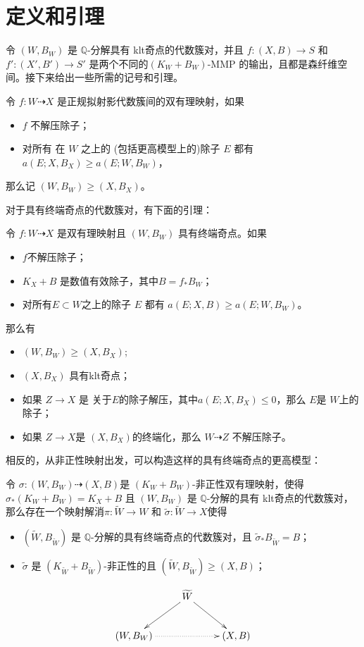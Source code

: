 \section{定义和引理}
令 $(W, B_W)$ 是 $\mathbb{Q}$-分解具有 klt奇点的代数簇对，并且 $f:(X, B)\to S$ 和 $f':(X', B')\to S'$ 是两个不同的$(K_{W}+B_{W})$-MMP 的输出，且都是森纤维空间。接下来给出一些所需的记号和引理。 
\begin{definition}
  令 $f: W\dashrightarrow X$ 是正规拟射影代数簇间的双有理映射，如果
  \begin{itemize}
    \item $f$ 不解压除子；
    \item 对所有 在 $W$ 之上的 (包括更高模型上的)除子 $E$ 都有  $a(E;X,B_{X})\geqslant a(E;W,B_{W})$，
  \end{itemize}
  那么记 $(W,B_{W})\geqslant (X,B_{X})$。
\end{definition}
对于具有终端奇点的代数簇对，有下面的引理：
\begin{lemma}\label{terminalorder}
  \cite[Lemma 13.8]{haconMinimalModelProgram2012} 令 $f:W\dashrightarrow X$ 是双有理映射且 $(W,B_{W})$  具有终端奇点。如果
  \begin{itemize}
    \item $f$不解压除子；
    \item $K_X+B$ 是数值有效除子，其中$B=f_*B_W$；
    \item  对所有$E \subset W$之上的除子 $E$ 都有 $a(E;X,B)\geqslant a(E;W,B_{W})$。
  \end{itemize}
  那么有
  \begin{itemize}
    \item $(W,B_{W})\geqslant (X,B_{X})$;
    \item $(X,B_{X})$ 具有klt奇点；
    \item 如果 $Z\to X$ 是 关于$E$的除子解压，其中$a(E;X,B_{X})\leqslant 0$，那么 $E$是 $W$上的除子；
    \item 如果 $Z\to X$是 $(X,B_{X})$的终端化，那么 $W\dashrightarrow Z$ 不解压除子。
  \end{itemize}
\end{lemma}
相反的，从非正性映射出发，可以构造这样的具有终端奇点的更高模型：
\begin{lemma}\label{terminalresolution}
  \cite[Lemma 3.5]{liuSarkisovProgramGeneralized2021} 令 $\sigma:(W,B_W)\dashrightarrow (X,B)$是 $(K_W+B_W)$-非正性双有理映射，使得 $\sigma_*(K_W+B_W)=K_X+B$ 且 $(W,B_W)$ 是 $\mathbb{Q}$-分解的具有 klt奇点的代数簇对，那么存在一个映射解消$\pi:\tilde{W}\to W $ 和 $\tilde{\sigma}:\tilde{W}\to X$使得 
  \begin{itemize}
    \item $(\tilde{W},B_{\tilde{W}})$ 是 $\mathbb{Q}$-分解的具有终端奇点的代数簇对，且 $\tilde{\sigma}_*B_{\tilde{W}}=B$；
    \item $\tilde{\sigma}$ 是 $(K_{\tilde{W}}+B_{\tilde{W}})$-非正性的且 $(\tilde{W},B_{\tilde{W}})\geqslant (X,B)$；
  \end{itemize}
  \[
    \xymatrix{
    & \widetilde{W}\ar[ld]\ar[rd] & \\
      (W,B_{W})\ar@{.>}[rr] & &(X,B)
    }
  \]
  
\end{lemma}

